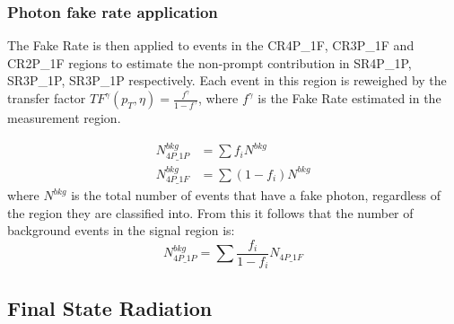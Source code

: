 \subsubsection{Photon fake rate application}
The Fake Rate is then applied to events in the CR4P\_1F, CR3P\_1F and CR2P\_1F regions to estimate the non-prompt contribution in SR4P\_1P, SR3P\_1P, SR3P\_1P respectively.
Each event in this region is reweighed by the transfer factor $TF^\gamma(p_T, \eta) = \frac{f^\gamma}{1-f^\gamma}$, where $f^\gamma$ is the Fake Rate estimated in the measurement region.

\begin{equation}
  \begin{split}
    \label{eq:fakeRate_explanation_part1}
    N^{bkg}_{4P\_1P} &= \sum f_i N^{bkg}
    \\
    N^{bkg}_{4P\_1F} &= \sum ( 1-f_i ) N^{bkg}
  \end{split}
\end{equation}
where $N^{bkg}$ is the total number of events that have a fake photon, regardless of the region they are classified into.
From this it follows that the number of background events in the signal region is:
\begin{equation}
  \label{eq:fakeRate_explanation_part2}
  N^{bkg}_{4P\_1P} = \sum \frac{f_i}{1-f_i} N_{4P\_1F}
\end{equation}

\subsection{Final State Radiation}
